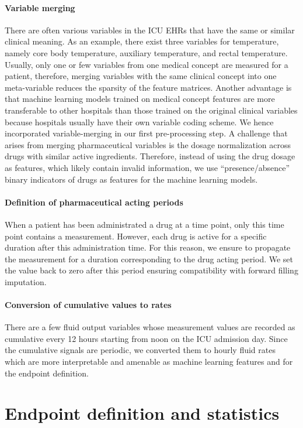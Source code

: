 \documentclass{article}
\begin{document}
\paragraph{Variable merging} There are often various variables in the ICU EHRs that have the same or similar clinical meaning. As an example, there exist three variables for temperature, namely core body temperature, auxiliary temperature, and rectal temperature. 
Usually, only one or few variables from one medical concept are measured for a patient, therefore, merging variables with the same clinical concept into one meta-variable reduces the sparsity of the feature matrices.
Another advantage is that machine learning models trained on medical concept features are more transferable to other hospitals than those trained on the original clinical variables because hospitals usually have their own variable coding scheme.  We hence incorporated variable-merging in our first pre-processing step. 
A challenge that arises from merging pharmaceutical variables is the dosage normalization across drugs with similar active ingredients.
Therefore, instead of using the drug dosage as features, which likely contain invalid information, we use ``presence/absence'' binary indicators of drugs as features for the machine learning models.

\paragraph{Definition of pharmaceutical acting periods} When a patient has been administrated a drug at a time point, only this time point contains a measurement. However, each drug is active for a specific duration after this administration time. For this reason, we ensure to propagate the measurement for a duration corresponding to the drug acting period. We set the value back to zero after this period ensuring compatibility with forward filling imputation. 

\paragraph{Conversion of cumulative values to rates} There are a few fluid output variables whose measurement values are recorded as cumulative every 12 hours starting from noon on the ICU admission day. Since the cumulative signals are periodic, we converted them to hourly fluid rates which are more interpretable and amenable as machine learning features and for the endpoint
definition.

\section*{Endpoint definition and statistics}
\end{document}
